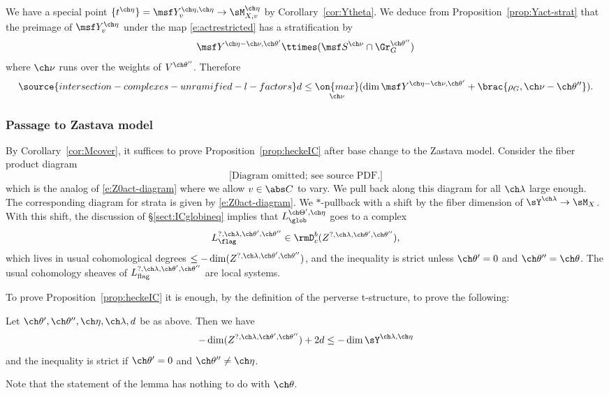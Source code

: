 We have a special point $\{ t^{\ch\eta} \} = \msf Y^{\ch\eta,\ch\eta}_v \to \sM^{\ch\eta}_{X,v}$
by Corollary~\ref{cor:Ytheta}.
We deduce from Proposition~\ref{prop:Yact-strat} that
the preimage of $\msf Y^{\ch\eta}_v$ under the map \eqref{e:actrestricted} has a
stratification by
\[ \msf Y^{\ch\eta - \ch\nu, \ch\theta'} \ttimes (\msf S^{\ch\nu} \cap \Gr^{\ch\theta''}_G) \]
where $\ch\nu$ runs over the weights of $V^{\ch\theta''}$.
Therefore
\begin{equation} \label{e:actfiberdim}
\source{intersection-complexes-unramified-l-factors}
d \le \underset{\ch\nu}{\on{max}} (\dim \msf Y^{\ch\eta-\ch\nu,\ch\theta'} + \brac{\rho_G,\ch\nu-\ch\theta''}).
\end{equation}


\subsubsection{Passage to Zastava model}
By Corollary~\ref{cor:Mcover}, it suffices to prove
Proposition~\ref{prop:heckeIC} after base change to the Zastava model.
Consider the fiber product diagram
\[\text{[Diagram omitted; see source PDF.]}
\]
which is the analog of \eqref{e:Z0act-diagram} where we allow $v\in \abs C$ to vary.
We pull back along this diagram for all $\ch\lambda$ large enough.
The corresponding diagram for strata is given by \eqref{e:Z0act-diagram}.
We $*$-pullback with a shift by the fiber dimension of
$\sY^{\ch\lambda}\to \sM_X$.
With this shift, the discussion of \S\ref{sect:ICglobineq}
implies that $L^{\ch\Theta',\ch\eta}_\glob$ goes to
a complex
\[ L^{?,\ch\lambda,\ch\theta',\ch\theta''}_\flag \in \rmD^b_c(Z^{?,\ch\lambda,\ch\theta',\ch\theta''}), \]
which lives in usual cohomological degrees
$\le -\dim( Z^{?,\ch\lambda,\ch\theta',\ch\theta''} )$, and
the inequality is strict unless $\ch\theta'=0$ and $\ch\theta''=\ch\theta$.
The usual cohomology sheaves of $L^{?,\ch\lambda,\ch\theta',\ch\theta''}_{\mathrm{flag}}$
are local systems.

To prove Proposition~\ref{prop:heckeIC} it is
enough, by the definition of the perverse t-structure,
to prove the following:

\begin{lem}
\notready \label{lem:heckeICflag}
Let $\ch\theta',\ch\theta'',\ch\eta,\ch\lambda,d$ be as above.
Then we have
\[
    -\dim( Z^{?,\ch\lambda,\ch\theta',\ch\theta''} ) + 2 d \le - \dim \sY^{\ch\lambda,\ch\eta}
\]
and the inequality is strict if $\ch\theta' = 0$ and $\ch\theta'' \ne \ch\eta$.
\end{lem}
Note that the statement of the lemma has nothing to do with $\ch\theta$.

